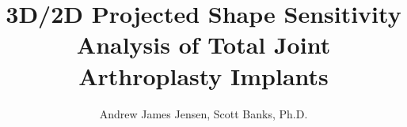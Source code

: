 \documentclass[12pt]{article}
\begin{document}
\title{3D/2D Projected Shape Sensitivity Analysis of Total Joint Arthroplasty Implants}
\author{Andrew James Jensen, Scott Banks, Ph.D.}
\date{}

\maketitle








\printbibliography
\end{document}
